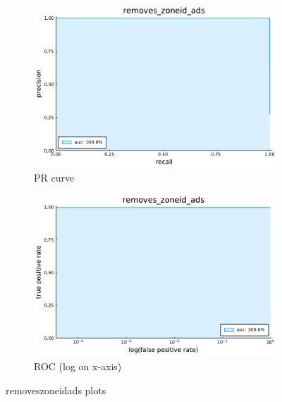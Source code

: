 \begin{figure}
    \centering
    \begin{subfigure}{.49\textwidth}
      \centering
      \includegraphics[width=1\linewidth]{pdfs/modperf/removes_zoneid_ads.bson-pr.pdf}
      \caption{PR curve}
    \end{subfigure}
    \begin{subfigure}{.49\textwidth}
        \centering
        \includegraphics[width=1\linewidth]{pdfs/modperf/removes_zoneid_ads.bson-roclog.pdf}
        \caption{ROC (log on x-axis)}
    \end{subfigure}
    \caption{removeszoneidads plots}
    \label{fig:fig}
\end{figure}

